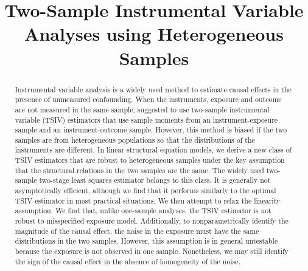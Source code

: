 \documentclass[preprint]{imsart}
\begin{document}
\begin{frontmatter}

  \title{Two-Sample Instrumental Variable Analyses using Heterogeneous
    Samples}


  \begin{abstract}
    Instrumental variable analysis is a widely used method to estimate causal
    effects in the presence of unmeasured
    confounding. When the instruments, exposure and outcome are not
    measured in the same sample, \citet{angrist1992effect} suggested to
    use two-sample instrumental variable (TSIV) estimators that use sample
    moments from an instrument-exposure sample and an instrument-outcome
    sample. However, this method is biased if the two samples
    are from heterogeneous populations so that the distributions of the
    instruments are different. In linear structural equation models, we
    derive a new class of TSIV estimators
    that are robust to heterogeneous samples under the key assumption that
    the structural relations in the two samples are the same. The widely
    used two-sample two-stage least squares estimator belongs to this
    class. It is generally not asymptotically efficient, although we
    find that it performs similarly to the optimal TSIV estimator in
    most practical situations. We then attempt to relax the linearity
    assumption. We find that, unlike one-sample analyses, the TSIV
    estimator is not robust to misspecified exposure
    model. Additionally, to nonparametrically identify the magnitude
    of the causal effect, the noise in the exposure must
    have the same distributions in the two samples. However, this
    assumption is in general untestable because the exposure is not
    observed in one sample. Nonetheless, we may still identify the sign of
    the causal effect in the absence of homogeneity of the noise.
  \end{abstract}


\end{frontmatter}
\end{document}
